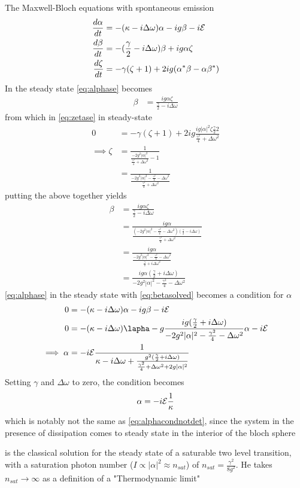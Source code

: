 The Maxwell-Bloch equations with spontaneous emission
\begin{align}
\frac{d \alpha}{dt} &= -(\kappa - i \Delta \omega)\alpha - ig \beta - i\mathcal{E}\label{eq:alphase}\\
\frac{d \beta}{dt} &= -(\frac{\gamma}{2}-i\Delta\omega)\beta+ig\alpha\zeta \label{eq:betase}\\
\frac{d\zeta}{dt} &= -\gamma (\zeta +1)+2ig(\alpha^*\beta-\alpha\beta^*) \label{eq:zetase}
\end{align}
In the steady state \cref{eq:alphase} becomes
\begin{align}
	\beta &= \frac{ig\alpha\zeta}{\frac{\gamma}{2}-i\Delta\omega}
\end{align}
from which in \cref{eq:zetase} in steady-state
\begin{align}
	0 &= -\gamma(\zeta+1)+2ig\frac{ig|\alpha|^2\zeta\frac{\gamma}{2}2}{\frac{\gamma^2}{4}+\Delta\omega^2} \\
	\implies \zeta &= \frac{1}{\frac{-2g^2|\alpha|^2}{\frac{\gamma^2}{4} +\Delta\omega^2}-1} \\
	&= \frac{1}{\frac{-2g^2|\alpha|^2 - \frac{\gamma^2}{4}-\Delta\omega^2}{\frac{\gamma^2}{4} +\Delta\omega^2}}
\end{align}
putting the above together yields
\begin{align}
	\beta &= \frac{ig\alpha\zeta}{\frac{\gamma}{2}-i\Delta\omega}\\
	&= \frac{ig\alpha}{\frac{(-2g^2|\alpha|^2-\frac{\gamma^2}{4}-\Delta\omega^2)(\frac{\gamma}{2}-i\Delta\omega)}{\frac{\gamma^2}{4}+\Delta\omega^2}}\\
	&= \frac{ig\alpha}{\frac{-2g^2|\alpha|^2-\frac{\gamma^2}{4}-\Delta\omega^2}{\frac{\gamma}{2}+i\Delta\omega^2}}\\
	&= \frac{ig\alpha(\frac{\gamma}{2}+i\Delta\omega)}{-2g^2|\alpha|^2-\frac{\gamma^2}{4}-\Delta\omega^2} \label{eq:betasolved}
\end{align}
\cref{eq:alphase} in the steady state with  \cref{eq:betasolved} becomes a condition for $\alpha$
\begin{align}
0 &= -(\kappa -i\Delta\omega)\alpha-ig\beta -i\Epsilon\\
0 &= -(\kappa -i\Delta\omega)\lapha-g\frac{ig(\frac{\gamma}{2}+i\Delta\omega)}{-2g^2|\alpha|^2-\frac{\gamma^2}{4}-\Delta\omega^2}\alpha-i\Epsilon \\
\implies \alpha &= -i\Epsilon \frac{1}{\kappa-i\Delta\omega+\frac{g^2(\frac{\gamma}{2}+i\Delta\omega)}{\frac{\gamma^2}{4}+\Delta\omega^2+2g|\alpha|^2}}\label{eq:alphadetdiss}
\end{align}
Setting $\gamma$ and $\Delta\omega$ to zero, the condition becomes
\begin{equation}
	\alpha = -i\mathcal{E}\frac{1}{\kappa}
\end{equation}
which is notably not the same as \cref{eq:alphacondnotdet}, since the system in the presence of dissipation comes to steady state in the interior of the bloch sphere

 is the classical solution for the steady state of a saturable two level transition, with a saturation photon number ($I \propto |\alpha|^2 \approx n_{sat}$) of $n_{sat} = \frac{\gamma^2}{8g^2}$. He takes $n_{sat} \rightarrow \infty$ as a definition of a "Thermodynamic limit"

